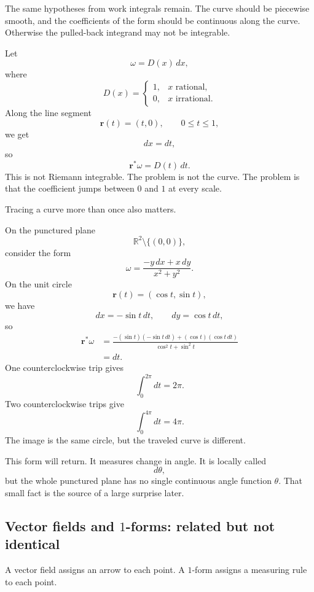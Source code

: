 The same hypotheses from work integrals remain.  The curve should be piecewise smooth,
and the coefficients of the form should be continuous along the curve.  Otherwise the
pulled-back integrand may not be integrable.

\begin{example}
Let
\[
    \omega=D(x)\,dx,
\]
where
\[
    D(x)=
    \begin{cases}
    1, & x \text{ rational},\\
    0, & x \text{ irrational}.
    \end{cases}
\]
Along the line segment
\[
    \mathbf r(t)=(t,0),
    \qquad
    0\le t\le1,
\]
we get
\[
    dx=dt,
\]
so
\[
    \mathbf r^*\omega=D(t)\,dt.
\]
This is not Riemann integrable.  The problem is not the curve.  The problem is that the
coefficient jumps between \(0\) and \(1\) at every scale.
\end{example}

Tracing a curve more than once also matters.

\begin{example}
On the punctured plane
\[
    \mathbb R^2\setminus\{(0,0)\},
\]
consider the form
\[
    \omega=\frac{-y\,dx+x\,dy}{x^2+y^2}.
\]
On the unit circle
\[
    \mathbf r(t)=(\cos t,\sin t),
\]
we have
\[
    dx=-\sin t\,dt,
    \qquad
    dy=\cos t\,dt,
\]
so
\[
\begin{aligned}
\mathbf r^*\omega
&=
\frac{-(\sin t)(-\sin t\,dt)+(\cos t)(\cos t\,dt)}
{\cos^2t+\sin^2t}\\
&=
dt.
\end{aligned}
\]
One counterclockwise trip gives
\[
    \int_0^{2\pi}dt=2\pi.
\]
Two counterclockwise trips give
\[
    \int_0^{4\pi}dt=4\pi.
\]
The image is the same circle, but the traveled curve is different.
\end{example}

This form will return.  It measures change in angle.  It is locally called
\[
    d\theta,
\]
but the whole punctured plane has no single continuous angle function \(\theta\).  That
small fact is the source of a large surprise later.

\subsection{Vector fields and \(1\)-forms: related but not identical}

A vector field assigns an arrow to each point.  A \(1\)-form assigns a measuring rule to
each point.

